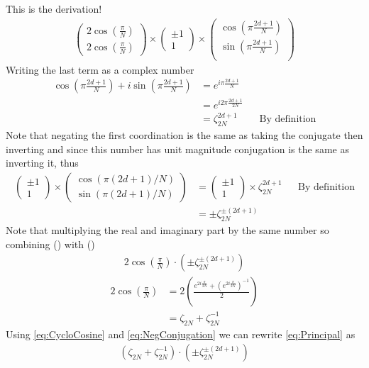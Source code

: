 \documentclass{article}
\begin{document}
This is the derivation!
\begin{align}
\begin{pmatrix}
2\cos\left(\frac{\pi}{N}\right) \\
2\cos\left(\frac{\pi}{N}\right)
\end{pmatrix}
\times
\begin{pmatrix}
\pm 1 \\
1
\end{pmatrix}
\times
\begin{pmatrix}
\cos\left(\pi\textstyle\frac{2d+1}{N}\right) \\
\sin\left(\pi\textstyle\frac{2d+1}{N}\right) \\
\end{pmatrix} \label{eq:Principal}
\end{align}
Writing the last term as a complex number 
\begin{align}
\cos\left(\pi\frac{2d+1}{N}\right) + 
i\sin\left(\pi\frac{2d+1}{N}\right)
&= e^{i\pi\frac{2d+1}{N}}\nonumber\\
&=e^{i2\pi\frac{2d+1}{2N}}\nonumber\\
&=\zeta_{2N}^{2d + 1} && \text{By definition}
\end{align}
Note that negating the first coordination is the same as taking the conjugate then inverting and since this number has unit magnitude conjugation is the same as inverting it, thus
\begin{align}
\begin{pmatrix}
\pm 1 \\
1
\end{pmatrix}
\times
\begin{pmatrix}
\cos(\pi(2d+1)/N) \\
\sin(\pi(2d+1)/N)
\end{pmatrix}
&= 
\begin{pmatrix}
\pm 1 \\
1
\end{pmatrix}
\times
\zeta_{2N}^{2d + 1} && \text{By definition}\nonumber \\
&= \pm\zeta_{2N}^{\pm (2d + 1)} \label{eq:NegConjugation}
\end{align}
Note that multiplying the real and imaginary part by the same number so combining () with ()
\begin{align}
2\cos\left(\frac{\pi}{N}\right)\cdot\left(\pm\zeta_{2N}^{\pm (2d + 1)}\right)
\end{align}
\begin{align}
2\cos\left(\frac{\pi}{N}\right) &= 2\left(\frac{e^{2i\frac{\pi}{2N}} + \left(e^{2i\frac{\pi}{2N}}\right)^{-1}}{2}\right) \nonumber
\\ &=\zeta_{2N} + \zeta_{2N}^{-1} \label{eq:CycloCosine}
\end{align}
Using \eqref{eq:CycloCosine} and \eqref{eq:NegConjugation} we can rewrite \eqref{eq:Principal} as 
\begin{align}
\left(\zeta_{2N} + \zeta_{2N}^{-1}\right)\cdot\left(\pm\zeta_{2N}^{\pm (2d + 1)}\right)
\end{align}
\end{document}
